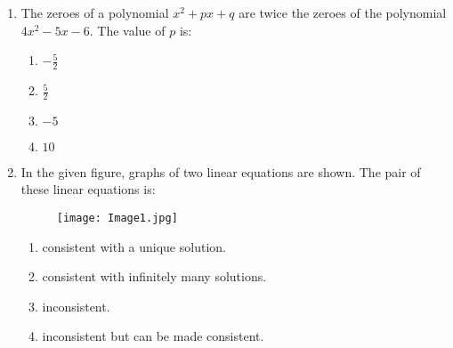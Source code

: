 \documentclass[12pt,-letter paper]{article}
\begin{document}
\begin{enumerate}
\item The zeroes of a polynomial $x^2 + px + q$ are twice the zeroes of the polynomial $4x^2 - 5x - 6$. The value of $p$ is:
	\begin{enumerate}   
\item $-\frac{5}{2}$
    \item $\frac{5}{2}$
    \item $-5$
    \item $10$
	\end{enumerate}
\newpage
 \item In the given figure, graphs of two linear equations are shown. The pair of these linear equations is:
\begin{figure}[!ht]
\centering
\texttt{[image: Image1.jpg]}
\caption{}
\label{fig:enter-label}
\end{figure}
\begin{enumerate}
    \item consistent with a unique solution.
    \item consistent with infinitely many solutions.
    \item inconsistent.
    \item inconsistent but can be made consistent.
\end{enumerate}
\end{enumerate}
\end{document}
